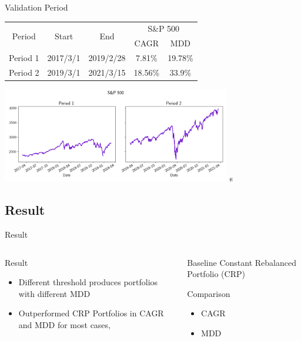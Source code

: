 \begin{frame}{Validation Period}
\begin{tabular}{||c|c|c|c|c||}
    \hline \hline
    \multirow{2}{*}{Period} &
    \multirow{2}{*}{Start} &
    \multirow{2}{*}{End} &
    \multicolumn{2}{c||}{S\&P 500} \\ 
    \cline{4-5} &{} &{} & CAGR & MDD \\ \hline \hline
    Period 1 & 2017/3/1 & 2019/2/28 & 7.81\% & 19.78\% \\ \hline
    Period 2 & 2019/3/1 & 2021/3/15 & 18.56\% & 33.9\% \\    
    \hline \hline
    \end{tabular}
      \centering
    \includegraphics[width=10cm]{images/sp500.png}
s
\end{frame}


\subsection{Result}
\begin{frame}{Result}

\begin{columns}[t]

\begin{column}{0.5\textwidth}
\begin{block}{Result}
\begin{itemize}
    \item Different threshold produces portfolios with different MDD
    \item Outperformed CRP Portfolios in CAGR and MDD for most cases, 
\end{itemize}
\end{block}
\end{column}

\begin{column}{0.5\textwidth}

\begin{block}{Baseline}
Constant Rebalanced Portfolio (CRP)
\end{block}


\begin{block}{Comparison}
    \begin{itemize}
        \item CAGR
        \item MDD
    \end{itemize}
\end{block}
\end{column}


\end{columns}
\end{frame}

